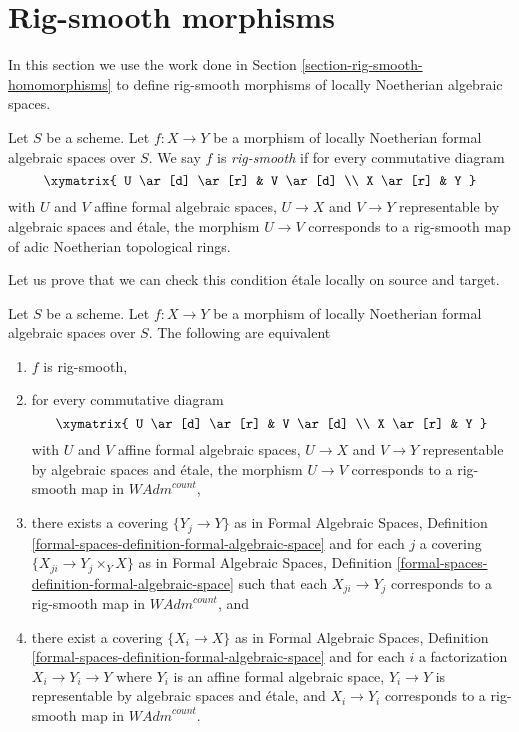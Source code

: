\section{Rig-smooth morphisms}
\label{section-rig-smooth-morphisms}

\noindent
In this section we use the work done in
Section \ref{section-rig-smooth-homomorphisms}
to define rig-smooth morphisms of locally Noetherian algebraic spaces.

\begin{definition}
\label{definition-rig-smooth}
Let $S$ be a scheme. Let $f : X \to Y$ be a morphism of locally
Noetherian formal algebraic spaces over $S$. We say $f$ is
{\it rig-smooth} if for every commutative diagram
$$
\xymatrix{
U \ar[d] \ar[r] & V \ar[d] \\
X \ar[r] & Y
}
$$
with $U$ and $V$ affine formal algebraic spaces, $U \to X$ and $V \to Y$
representable by algebraic spaces and \'etale, the morphism $U \to V$
corresponds to a rig-smooth map of adic Noetherian topological rings.
\end{definition}

\noindent
Let us prove that we can check this condition \'etale locally on
source and target.

\begin{lemma}
\label{lemma-rig-smooth-morphisms}
Let $S$ be a scheme. Let $f : X \to Y$ be a morphism of
locally Noetherian formal algebraic spaces over $S$.
The following are equivalent
\begin{enumerate}
\item $f$ is rig-smooth,
\item for every commutative diagram
$$
\xymatrix{
U \ar[d] \ar[r] & V \ar[d] \\
X \ar[r] & Y
}
$$
with $U$ and $V$ affine formal algebraic spaces, $U \to X$ and $V \to Y$
representable by algebraic spaces and \'etale, the morphism $U \to V$
corresponds to a rig-smooth map in $\textit{WAdm}^{count}$,
\item there exists a covering $\{Y_j \to Y\}$ as in
Formal Algebraic Spaces,
Definition \ref{formal-spaces-definition-formal-algebraic-space}
and for each $j$
a covering $\{X_{ji} \to Y_j \times_Y X\}$ as in
Formal Algebraic Spaces,
Definition \ref{formal-spaces-definition-formal-algebraic-space}
such that each $X_{ji} \to Y_j$  corresponds
to a rig-smooth map in $\textit{WAdm}^{count}$, and
\item there exist a covering $\{X_i \to X\}$ as in
Formal Algebraic Spaces,
Definition \ref{formal-spaces-definition-formal-algebraic-space}
and for each $i$ a factorization $X_i \to Y_i \to Y$ where $Y_i$
is an affine formal algebraic space, $Y_i \to Y$ is representable
by algebraic spaces and \'etale, and $X_i \to Y_i$ corresponds
to a rig-smooth map in $\textit{WAdm}^{count}$.
\end{enumerate}
\end{lemma}

